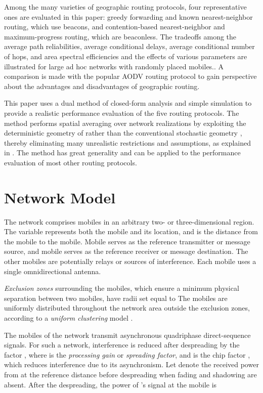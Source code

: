 \documentclass[conference]{IEEEtran}
\begin{document}
Among the many varieties of geographic routing protocols, four
representative ones are evaluated in this paper: greedy forwarding and known
nearest-neighbor routing, which use beacons, and contention-based
nearest-neighbor and maximum-progress routing, which are beaconless. The
tradeoffs among the average path reliabilities, average conditional delays,
average conditional number of hops, and area spectral efficiencies and the
effects of various parameters are illustrated for large ad hoc networks with
randomly placed mobiles.. A comparison is made with the popular AODV routing
protocol to gain perspective about the advantages and disadvantages of
geographic routing.

This paper uses a dual method of closed-form analysis and simple simulation to
provide a realistic performance evaluation of the five routing protocols. The
method performs spatial averaging over network realizations by exploiting the
deterministic geometry of \cite{tor} rather than the conventional stochastic
geometry \cite{haen}, thereby eliminating many unrealistic restrictions and
assumptions, as explained in \cite{tor4}. The method has great generality and
can be applied to the performance evaluation of most other routing protocols.

\section{Network Model}

The network comprises  mobiles in an arbitrary two- or three-dimensional
region. The variable  represents both the  mobile and its
location, and  is the distance from the  mobile to
the  mobile. Mobile  serves as the reference transmitter or
message source, and mobile  serves as the reference receiver or
message destination. The other  mobiles  are potentially
relays or sources of interference. Each mobile uses a single omnidirectional antenna.

\emph{Exclusion zones} surrounding the mobiles, which ensure a minimum
physical separation between two mobiles, have radii set equal to
 The mobiles are uniformly distributed throughout the
network area outside the exclusion zones, according to a \textit{uniform
clustering} model \cite{tor1}.

The mobiles of the network transmit asynchronous quadriphase direct-sequence
signals. For such a network, interference is reduced after despreading by the
factor , where  is the \emph{processing gain} or \emph{spreading
factor}, and  is the chip factor \cite{tor}, which reduces interference
due to its asynchronism. Let  denote the
received power from  at the reference distance  before
despreading when fading and shadowing are absent. After the despreading, the
power of 's signal at the mobile  is
\end{document}
